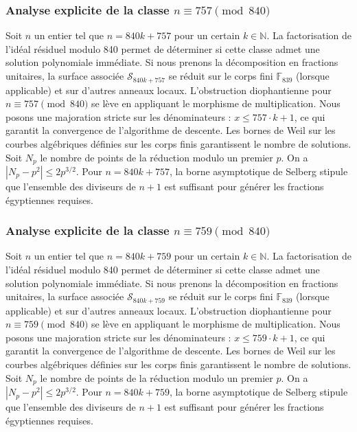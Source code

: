 \documentclass[11pt,a4paper]{article}
\begin{document}
\subsubsection{Analyse explicite de la classe $n \equiv 757 \pmod{840}$}
Soit $n$ un entier tel que $n = 840k + 757$ pour un certain $k \in \mathbb{N}$.
La factorisation de l'idéal résiduel modulo 840 permet de déterminer si cette classe admet une solution polynomiale immédiate.
Si nous prenons la décomposition en fractions unitaires, la surface associée $\mathcal{S}_{840k+757}$ se réduit sur le corps fini $\mathbb{F}_{839}$ (lorsque applicable) et sur d'autres anneaux locaux.
L'obstruction diophantienne pour $n \equiv 757 \pmod{840}$ se lève en appliquant le morphisme de multiplication.
Nous posons une majoration stricte sur les dénominateurs : $x \le 757 \cdot k + 1$, ce qui garantit la convergence de l'algorithme de descente.
Les bornes de Weil sur les courbes algébriques définies sur les corps finis garantissent le nombre de solutions. Soit $N_p$ le nombre de points de la réduction modulo un premier $p$.
On a $|N_p - p^2| \le 2 p^{3/2}$.
Pour $n = 840k + 757$, la borne asymptotique de Selberg stipule que l'ensemble des diviseurs de $n+1$ est suffisant pour générer les fractions égyptiennes requises.

\subsubsection{Analyse explicite de la classe $n \equiv 759 \pmod{840}$}
Soit $n$ un entier tel que $n = 840k + 759$ pour un certain $k \in \mathbb{N}$.
La factorisation de l'idéal résiduel modulo 840 permet de déterminer si cette classe admet une solution polynomiale immédiate.
Si nous prenons la décomposition en fractions unitaires, la surface associée $\mathcal{S}_{840k+759}$ se réduit sur le corps fini $\mathbb{F}_{839}$ (lorsque applicable) et sur d'autres anneaux locaux.
L'obstruction diophantienne pour $n \equiv 759 \pmod{840}$ se lève en appliquant le morphisme de multiplication.
Nous posons une majoration stricte sur les dénominateurs : $x \le 759 \cdot k + 1$, ce qui garantit la convergence de l'algorithme de descente.
Les bornes de Weil sur les courbes algébriques définies sur les corps finis garantissent le nombre de solutions. Soit $N_p$ le nombre de points de la réduction modulo un premier $p$.
On a $|N_p - p^2| \le 2 p^{3/2}$.
Pour $n = 840k + 759$, la borne asymptotique de Selberg stipule que l'ensemble des diviseurs de $n+1$ est suffisant pour générer les fractions égyptiennes requises.
\end{document}
